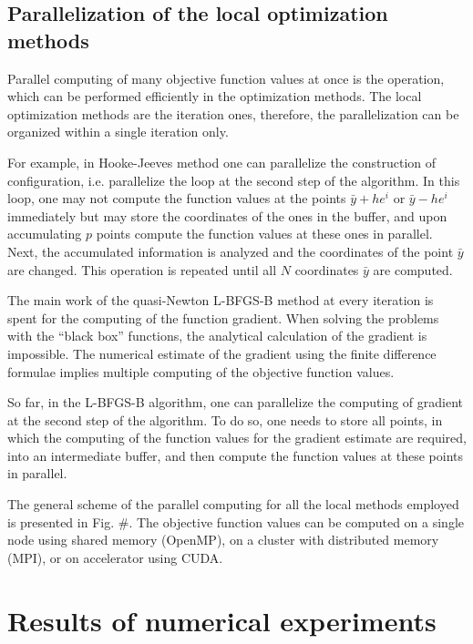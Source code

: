 \documentclass[runningheads]{llncs}
\begin{document}
\subsection{Parallelization of the local optimization methods}

Parallel computing of many objective function values at once is the operation, which can be performed efficiently in the optimization methods. The local optimization methods are the iteration ones, therefore, the parallelization can be organized within a single iteration only.

For example, in Hooke-Jeeves method one can parallelize the construction of configuration, i.e. parallelize the loop at the second step of the algorithm. In this loop, one may not compute the function values at the points $\bar{y} + he^i$ or $\bar{y} - he^i$ immediately but may store the coordinates of the ones in the buffer, and upon accumulating $p$ points compute the function values at these ones in parallel. Next, the accumulated information is analyzed and the coordinates of the point $\bar{y}$ are changed. This operation is repeated until all $N$ coordinates $\bar{y}$ are computed.

The main work of the quasi-Newton L-BFGS-B method at every iteration is spent for the computing of the function gradient. When solving the problems with the ``black box'' functions, the analytical calculation of the gradient is impossible. The numerical estimate of the gradient using the finite difference formulae implies multiple computing of the objective function values.

So far, in the L-BFGS-B algorithm, one can parallelize the computing of gradient at the second step of the algorithm. To do so, one needs to store all points, in which the computing of the function values for the gradient estimate are required, into an intermediate buffer, and then compute the function values at these points in parallel.

The general scheme of the parallel computing for all the local methods employed is presented in Fig. \#. The objective function values can be computed on a single node using shared memory (OpenMP), on a cluster with distributed memory (MPI), or on accelerator using CUDA.

\section{Results of numerical experiments}
\end{document}

